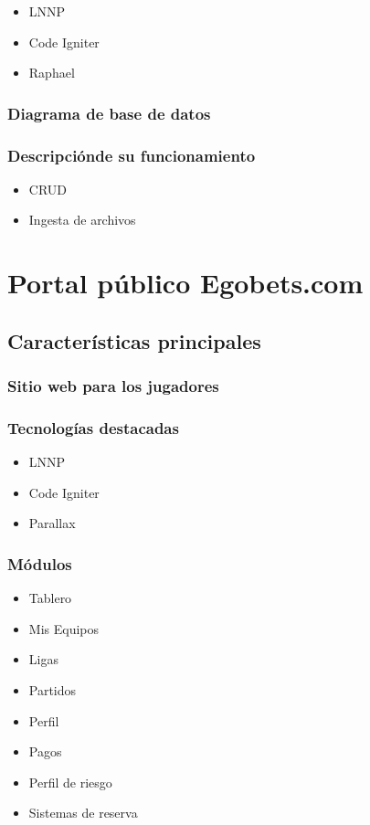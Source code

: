  \begin{itemize}
 	\item LNNP
 	\item Code Igniter
 	\item Raphael
 \end{itemize}
 
 \subsubsection{Diagrama de base de datos}
 
 \subsubsection{Descripciónde su funcionamiento}
 
 \begin{itemize}
 	\item CRUD
 	\item Ingesta de archivos
	
 \end{itemize}
 

\section{Portal público Egobets.com}

\subsection{Características principales}
\subsubsection{Sitio web para los jugadores}
\subsubsection{Tecnologías destacadas}
 
 \begin{itemize}
 	\item LNNP
 	\item Code Igniter
 	\item Parallax
 \end{itemize}
  
\subsubsection{Módulos}

 \begin{itemize}
 	\item Tablero
 	\item Mis Equipos
 	\item Ligas
 	\item Partidos
 	\item Perfil
 	\item Pagos
 	\item Perfil de riesgo
 	\item Sistemas de reserva
 \end{itemize}
 
